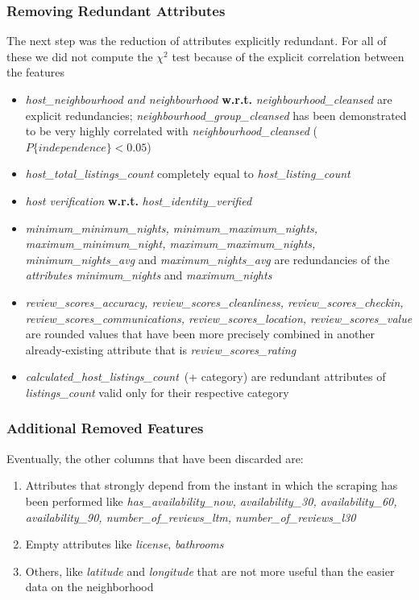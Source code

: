 \subsubsection{Removing Redundant Attributes}
The next step was the reduction of attributes explicitly redundant. For all of these we did not compute the $\chi^2$ test because of the explicit correlation between the features

\begin{itemize}
	\item \textit{host\_neighbourhood and neighbourhood} \textbf{w.r.t.} \textit{neighbourhood\_cleansed} are explicit redundancies; 	\textit{neighbourhood\_group\_cleansed} has been demonstrated to be very highly correlated with \textit{neighbourhood\_cleansed} ($P\{independence\}<0.05$)
	\item \textit{host\_total\_listings\_count} completely equal to \textit{host\_listing\_count}
	\item \textit{host verification} \textbf{w.r.t.} \textit{host\_identity\_verified}
	\item \textit{minimum\_minimum\_nights, minimum\_maximum\_nights, maximum\_minimum\_night, maximum\_maximum\_nights, minimum\_nights\_avg} and \textit{maximum\_nights\_avg} are redundancies of the \textit{attributes minimum\_nights} and \textit{maximum\_nights}
	\item \textit{review\_scores\_accuracy, review\_scores\_cleanliness, review\_scores\_checkin, review\_scores\_communications, review\_scores\_location, review\_scores\_value} are rounded values that have been more precisely combined in another already-existing attribute that is \textit{review\_scores\_rating}
	\item \textit{calculated\_host\_listings\_count} (+ category) are redundant attributes of \textit{listings\_count} valid only for their respective category
\end{itemize}

\subsubsection{Additional Removed Features}
Eventually, the other columns that have been discarded are:

\begin{enumerate}
	\item Attributes that strongly depend from the instant in which the scraping has been performed like \textit{has\_availability\_now, availability\_30, availability\_60, availability\_90, number\_of\_reviews\_ltm, number\_of\_reviews\_l30}
	\item Empty attributes like \textit{license}, \textit{bathrooms}
	\item Others, like \textit{latitude} and \textit{longitude} that are not more useful than the easier data on the neighborhood
\end{enumerate}


